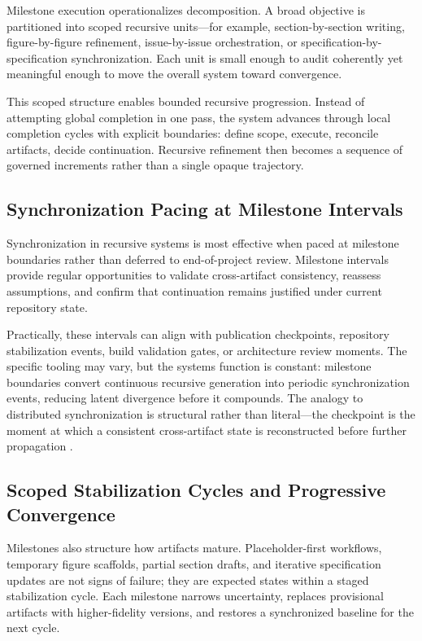 Milestone execution operationalizes decomposition. A broad objective is partitioned into scoped recursive units---for example, section-by-section writing, figure-by-figure refinement, issue-by-issue orchestration, or specification-by-specification synchronization. Each unit is small enough to audit coherently yet meaningful enough to move the overall system toward convergence.

This scoped structure enables bounded recursive progression. Instead of attempting global completion in one pass, the system advances through local completion cycles with explicit boundaries: define scope, execute, reconcile artifacts, decide continuation. Recursive refinement then becomes a sequence of governed increments rather than a single opaque trajectory.

\subsection{Synchronization Pacing at Milestone Intervals}

Synchronization in recursive systems is most effective when paced at milestone boundaries rather than deferred to end-of-project review. Milestone intervals provide regular opportunities to validate cross-artifact consistency, reassess assumptions, and confirm that continuation remains justified under current repository state.

Practically, these intervals can align with publication checkpoints, repository stabilization events, build validation gates, or architecture review moments. The specific tooling may vary, but the systems function is constant: milestone boundaries convert continuous recursive generation into periodic synchronization events, reducing latent divergence before it compounds. The analogy to distributed synchronization is structural rather than literal---the checkpoint is the moment at which a consistent cross-artifact state is reconstructed before further propagation \cite{Lamport1978TimeClocks,Chandy1985DistributedSnapshots}.

\subsection{Scoped Stabilization Cycles and Progressive Convergence}

Milestones also structure how artifacts mature. Placeholder-first workflows, temporary figure scaffolds, partial section drafts, and iterative specification updates are not signs of failure; they are expected states within a staged stabilization cycle. Each milestone narrows uncertainty, replaces provisional artifacts with higher-fidelity versions, and restores a synchronized baseline for the next cycle.

